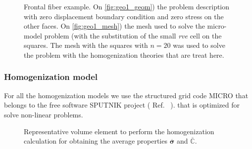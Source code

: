 \documentclass[3p]{elsarticle}
\newcommand{\sputnik}{{\ttfamily \fontseries{b}\selectfont SPUTNIK }}
\newcommand{\micro}{{\ttfamily \fontseries{b}\selectfont MICRO }}
\begin{document}
\begin{figure}[!ht]
\begin{minipage}[b]{0.47\linewidth}
\subcaptionbox{\label{fig:geo1_geom}}{
\resizebox{8.0cm}{!}{}}
\end{minipage}
\hspace{2.2cm}
\begin{minipage}[b]{0.47\linewidth}
\subcaptionbox{\label{fig:geo1_mesh}}{
\resizebox{8.0cm}{!}{}}
\end{minipage}
\caption{Frontal fiber example. On \ref{fig:geo1_geom}) the problem description
         with zero displacement boundary condition and zero stress on the other faces. On
         \ref{fig:geo1_mesh}) the mesh used to solve the micro-model problem (with the
         substitution of the small \emph{rve} cell on the squares. The mesh with the
         squares with $n=20$ was used to solve the problem with the homogenization
         theories that are treat here. }
\label{fig_dist_scheme}
\end{figure}

\subsubsection{Homogenization model}

For all the homogenization models we use the structured grid code \micro that belongs to the 
free software \sputnik project ( Ref.~\cite{sputnik} ).
that is optimized for solve non-linear problems.

\begin{figure}[!ht]
\centering
{}
\caption{Representative volume element to perform the homogenization calculation for obtaining the 
average properties $\overline{\bm{\sigma}}$ and $\overline{\mathbb{C}}$.}
\label{fig_rve_front_fib}
\end{figure}
\end{document}

